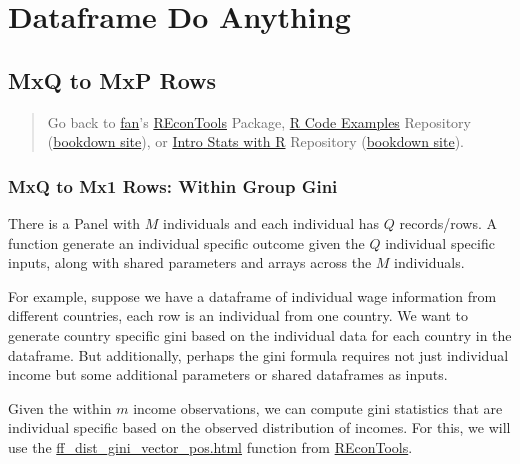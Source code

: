 \documentclass[
]{book}
\begin{document}
\hypertarget{dataframe-do-anything}{%
\section{Dataframe Do Anything}\label{dataframe-do-anything}}

\hypertarget{mxq-to-mxp-rows}{%
\subsection{MxQ to MxP Rows}\label{mxq-to-mxp-rows}}

\begin{quote}
Go back to \href{http://fanwangecon.github.io/}{fan}'s \href{https://fanwangecon.github.io/REconTools/}{REconTools} Package, \href{https://fanwangecon.github.io/R4Econ/}{R Code Examples} Repository (\href{https://fanwangecon.github.io/R4Econ/bookdown}{bookdown site}), or \href{https://fanwangecon.github.io/Stat4Econ/}{Intro Stats with R} Repository (\href{https://fanwangecon.github.io/Stat4Econ/bookdown}{bookdown site}).
\end{quote}

\hypertarget{mxq-to-mx1-rows-within-group-gini}{%
\subsubsection{MxQ to Mx1 Rows: Within Group Gini}\label{mxq-to-mx1-rows-within-group-gini}}

There is a Panel with \(M\) individuals and each individual has \(Q\) records/rows. A function generate an individual specific outcome given the \(Q\) individual specific inputs, along with shared parameters and arrays across the \(M\) individuals.

For example, suppose we have a dataframe of individual wage information from different countries, each row is an individual from one country. We want to generate country specific gini based on the individual data for each country in the dataframe. But additionally, perhaps the gini formula requires not just individual income but some additional parameters or shared dataframes as inputs.

Given the within \(m\) income observations, we can compute gini statistics that are individual specific based on the observed distribution of incomes. For this, we will use the \href{https://fanwangecon.github.io/REconTools/reference/ff_dist_gini_vector_pos.html}{ff\_dist\_gini\_vector\_pos.html} function from \href{https://fanwangecon.github.io/REconTools/}{REconTools}.
\end{document}
